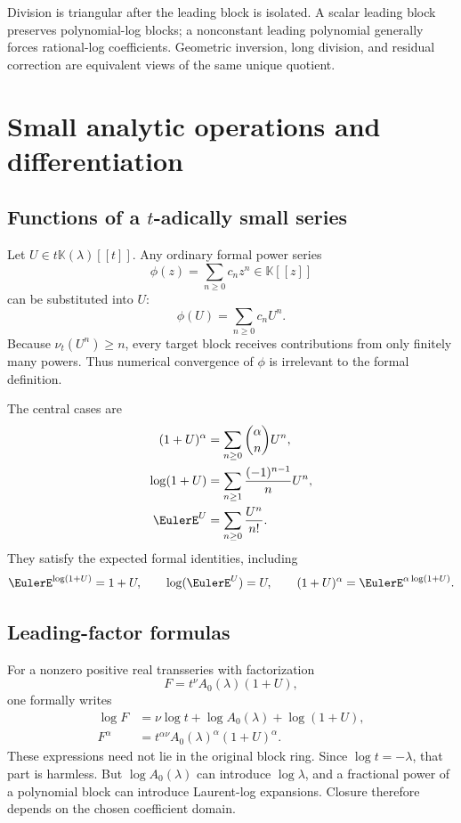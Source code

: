 \documentclass[11pt,openany]{book}
\theoremstyle{definition}
\theoremstyle{plain}
\theoremstyle{remark}
\newcommand{\K}{\mathbb{K}}
\newcommand{\val}{\nu}
\begin{document}
\begin{summarybox}
Division is triangular after the leading block is isolated. A scalar leading block preserves polynomial-log blocks; a nonconstant leading polynomial generally forces rational-log coefficients. Geometric inversion, long division, and residual correction are equivalent views of the same unique quotient.
\end{summarybox}

\chapter{Small analytic operations and differentiation}\label{ch:elementary-functions}

\section{Functions of a \texorpdfstring{\(t\)}{t}-adically small series}
Let \(U\in t\K(\lambda)[[t]]\). Any ordinary formal power series
\[
 \phi(z)=\sum_{n\ge0}c_nz^n\in\K[[z]]
\]
can be substituted into \(U\):
\begin{equation}\label{eq:ordinary-substitution}
 \phi(U)=\sum_{n\ge0}c_nU^n.
\end{equation}
Because \(\val_t(U^n)\ge n\), every target block receives contributions from only finitely many powers. Thus numerical convergence of \(\phi\) is irrelevant to the formal definition.

The central cases are
\begin{align}
 (1+U)^\alpha&=\sum_{n\ge0}\binom{\alpha}{n}U^n,
 \label{eq:formal-binomial}\\
 \log(1+U)&=\sum_{n\ge1}\frac{(-1)^{n-1}}{n}U^n,
 \label{eq:formal-log}\\
 \EulerE^U&=\sum_{n\ge0}\frac{U^n}{n!}.
 \label{eq:formal-exp}
\end{align}
They satisfy the expected formal identities, including
\[
 \EulerE^{\log(1+U)}=1+U,
 \qquad
 \log(\EulerE^U)=U,
 \qquad
 (1+U)^\alpha=\EulerE^{\alpha\log(1+U)}.
\]

\section{Leading-factor formulas}
For a nonzero positive real transseries with factorization
\[
 F=t^\nu A_0(\lambda)(1+U),
\]
one formally writes
\begin{align}
 \log F&=\nu\log t+\log A_0(\lambda)+\log(1+U),\label{eq:log-leading-factor}\\
 F^\alpha&=t^{\alpha\nu}A_0(\lambda)^\alpha(1+U)^\alpha.
 \label{eq:power-leading-factor}
\end{align}
These expressions need not lie in the original block ring. Since \(\log t=-\lambda\), that part is harmless. But \(\log A_0(\lambda)\) can introduce \(\log\lambda\), and a fractional power of a polynomial block can introduce Laurent-log expansions. Closure therefore depends on the chosen coefficient domain.
\end{document}
